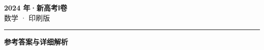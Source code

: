 \documentclass[zihao=5, a4paper]{ctexart}
\begin{document}
\begin{center}
  {\Large\bfseries 2024 年·新高考Ⅰ卷}\\[4pt]
  {\large 数学 · 印刷版}
\end{center}
\medskip
{}

\par\bigskip\hrule\bigskip
{}
\begin{center}{\large\bfseries 参考答案与详细解析}\end{center}
\smallskip

\end{document}
